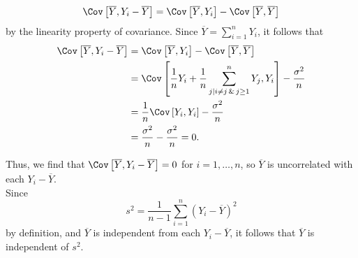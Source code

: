 \begin{enumerate}[a)]
    \[
        \Cov\left[ \overline{Y}, Y_i - \overline{Y} \right] = \Cov \left[\overline{Y}, Y_i \right] - \Cov \left[\overline{Y}, \overline{Y}  \right]
    \]
    by the linearity property of covariance. Since $\overline{Y} = \sum_{i = 1}^n Y_i$, it follows that
    \begin{align*}
        \Cov\left[ \overline{Y}, Y_i - \overline{Y} \right] &= \Cov \left[\overline{Y}, Y_i \right] - \Cov \left[\overline{Y}, \overline{Y}  \right] \\
        &= \Cov \left[\frac{1}{n}Y_i + \frac{1}{n}\sum_{j \mid i \neq j \, \& \, j \geq 1}^{n} Y_j, Y_i \right] - \frac{\sigma^2}{n} \\
        &= \frac{1}{n} \Cov \left[ Y_i, Y_i\right] - \frac{\sigma^2}{n} \\
        &= \frac{\sigma^2}{n} - \frac{\sigma^2}{n} = 0.
    \end{align*}

    Thus, we find that $\Cov \left[\overline{Y}, Y_i - \overline{Y} \right] = 0$ for $i = 1, \dots, n$, so $\overline{Y}$ is uncorrelated with each $Y_i - \overline{Y}$. \\

    Since 
    \[
        s^2 = \frac{1}{n-1} \sum_{i=1}^n (Y_i - \overline{Y})^2
    \] 
    by definition, and $\overline{Y}$ is independent from each $Y_i - \overline{Y}$, it follows that $\overline{Y}$ is independent of $s^2$.
\end{enumerate}